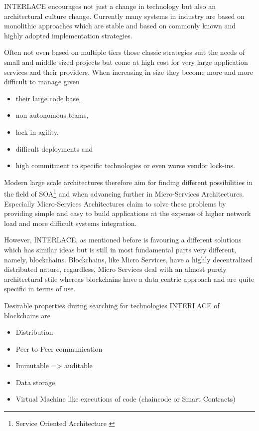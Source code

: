 INTERLACE encourages not just a change in technology but also an architectural culture change. Currently many systems in industry are based on monolithic approaches which are stable and based on commonly known and highly adopted implementation strategies.

Often not even based on multiple tiers those classic strategies suit the needs of small and middle sized projects but come at high cost for very large application services and their providers. When increasing in size they become more and more difficult to manage given

\begin{itemize}
	\item their large code base,
	\item non-autonomous teams,
	\item lack in agility,
	\item difficult deployments and
	\item high commitment to specific technologies or even worse vendor lock-ins.
\end{itemize}

Modern large scale architectures therefore aim for finding different possibilities in the field of SOA\footnote{Service Oriented Architecture \cite{erl2014next}} and when advancing further in Micro-Services Architectures. Especially Micro-Services Architectures \cite{newman2015building} claim to solve these problems by providing simple and easy to build applications at the expense of higher network load and more difficult systems integration.

However, INTERLACE, as mentioned before is favouring a different solutions which has similar ideas but is still in most fundamental parts very different, namely, blockchains. Blockchains, like Micro Services, have a highly decentralized distributed nature, regardless, Micro Services deal with an almost purely architectural stile whereas blockchains have a data centric approach and are quite specific in terms of use.

Desirable properties during searching for technologies INTERLACE of blockchains are

\begin{itemize}
	\item Distribution
	\item Peer to Peer communication
	\item Immutable => auditable 
	\item Data storage
	\item Virtual Machine like executions of code (chaincode or Smart Contracts)
\end{itemize}

